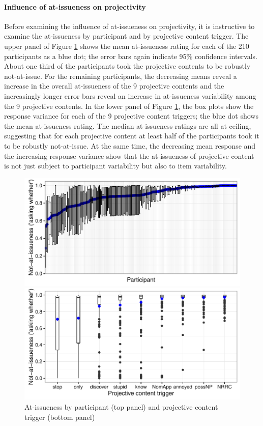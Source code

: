 \documentclass[11pt,fleqn]{article}
\newcommand{\6}{\mbox{$[\hspace*{-.6mm}[$}}
\newcommand{\9}{\mbox{$]\hspace*{-.6mm}]$}}
\begin{document}
\paragraph{Influence of at-issueness on projectivity} Before examining the influence of at-issueness on projectivity, it is instructive to examine the at-issueness by participant and by projective content trigger. The upper panel of Figure \ref{f-ai-1a} shows the mean at-issueness rating for each of the 210 participants as a blue dot; the error bars again indicate 95\% confidence intervals. About one third of the participants took the projective contents to be robustly not-at-issue. For the remaining participants, the decreasing means reveal a increase in the overall at-issueness of the 9 projective contents and the increasingly longer error bars reveal an increase in at-issueness variability among the 9 projective contents. In the lower panel of Figure \ref{f-ai-1a}, the box plots show the response variance for each of the 9 projective content triggers; the blue dot shows the mean at-issueness rating. The median at-issueness ratings are all at ceiling, suggesting that for each projective content at least half of the participants took it to be robustly not-at-issue. At the same time, the decreasing mean response and the increasing response variance show that the at-issueness of projective content is not just subject to participant variability but also to item variability.

\begin{figure}[!h]
\begin{center}

\includegraphics[width=12cm]{../results/exp1a/graphs/ai-subjectmeans}

\includegraphics[width=12cm]{../results/exp1a/graphs/boxplot-not-at-issueness}

\end{center}
\caption{At-issueness by participant (top panel) and projective content trigger (bottom panel)}
\label{f-ai-1a}
\end{figure}
\end{document}
